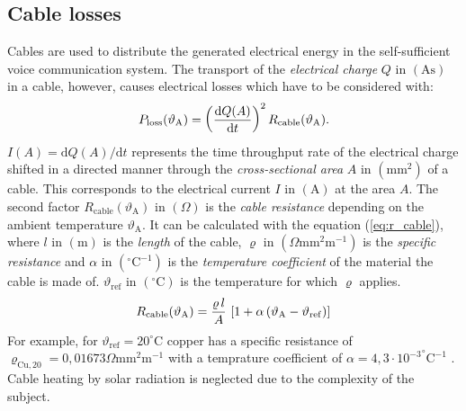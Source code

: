 \subsection{Cable losses}
Cables are used to distribute the generated electrical energy in the self-sufficient voice communication system. The transport of the \emph{electrical charge} $Q$ in $\left( \mathrm{As} \right)$ in a cable, however, causes electrical losses which have to be considered with: 
	\begin{equation} \label{eq:p_cable}
	\centering
		 P_\mathrm{loss}(\vartheta_\mathrm{A}) = \left(\dfrac{\mathrm d Q(A)}{\mathrm d t}\right)^2 R_\mathrm{cable}(\vartheta_\mathrm{A}) \text{.}
	\end{equation}
$I(A) = \mathrm d Q(A) / \mathrm d t$ represents the time throughput rate of the electrical charge shifted in a directed manner through the \emph{cross-sectional area} $A$ in $\left( \mathrm{mm}^2 \right)$ of a cable. This corresponds to the electrical current $I$ in $\left( \mathrm{A} \right)$ at the area $A$. The second factor $R_\mathrm{cable}(\vartheta_\mathrm{A})$ in $\left( \Omega \right)$ is the \emph{cable resistance} depending on the ambient temperature $\vartheta_\mathrm{A}$. It can be calculated with the equation (\ref{eq:r_cable}), where $l$ in $\left( \mathrm m \right)$ is the \emph{length} of the cable, $\varrho$ in $\left(\Omega \mathrm{mm}^2\mathrm{m}^{-1}\right)$ is the \emph{specific resistance} and $\alpha$ in $\left( ^\circ \mathrm{C}^{-1} \right)$ is the \emph{temperature coefficient} of the material the cable is made of. $\vartheta_\mathrm{ref}$ in $\left( ^\circ \mathrm{C} \right)$ is the temperature for which $\varrho$ applies.
	\begin{equation} \label{eq:r_cable}
	\centering
		 R_\mathrm{cable}(\vartheta_\mathrm{A}) = \dfrac{\varrho \, l}{A} \, \left[1 + \alpha \left( \vartheta_\mathrm{A} - \vartheta_\mathrm{ref}\right) \right]
	\end{equation}
For example, for $\vartheta_\mathrm{ref} = 20^\circ \mathrm{C}$ copper has a specific resistance of $\varrho_\mathrm{Cu,20} = 0,01673 \Omega \mathrm{mm}^2\mathrm{m}^{-1}$ with a temprature coefficient of $\alpha = {4,3 \cdot 10^{-3}}^\circ \mathrm{C}^{-1}$ \cite{Gerhard-Fasching:2005, Prechtl:2006}. Cable heating by solar radiation is neglected due to the complexity of the subject. 
